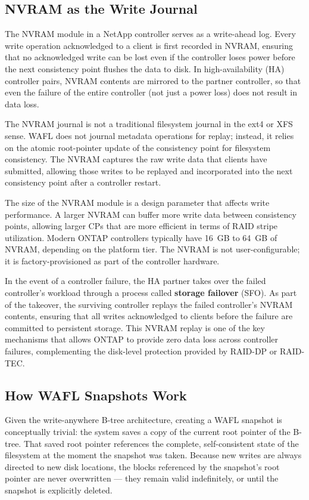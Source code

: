 \subsection{NVRAM as the Write Journal}

The NVRAM module in a NetApp controller serves as a write-ahead log. Every write operation acknowledged to a client is first recorded in NVRAM, ensuring that no acknowledged write can be lost even if the controller loses power before the next consistency point flushes the data to disk. In high-availability (HA) controller pairs, NVRAM contents are mirrored to the partner controller, so that even the failure of the entire controller (not just a power loss) does not result in data loss.

The NVRAM journal is not a traditional filesystem journal in the ext4 or XFS sense. WAFL does not journal metadata operations for replay; instead, it relies on the atomic root-pointer update of the consistency point for filesystem consistency. The NVRAM captures the raw write data that clients have submitted, allowing those writes to be replayed and incorporated into the next consistency point after a controller restart.

The size of the NVRAM module is a design parameter that affects write performance. A larger NVRAM can buffer more write data between consistency points, allowing larger CPs that are more efficient in terms of RAID stripe utilization. Modern ONTAP controllers typically have 16~GB to 64~GB of NVRAM, depending on the platform tier. The NVRAM is not user-configurable; it is factory-provisioned as part of the controller hardware.

In the event of a controller failure, the HA partner takes over the failed controller's workload through a process called \textbf{storage failover} (SFO). As part of the takeover, the surviving controller replays the failed controller's NVRAM contents, ensuring that all writes acknowledged to clients before the failure are committed to persistent storage. This NVRAM replay is one of the key mechanisms that allows ONTAP to provide zero data loss across controller failures, complementing the disk-level protection provided by RAID-DP or RAID-TEC.

\subsection{How WAFL Snapshots Work}

Given the write-anywhere B-tree architecture, creating a WAFL snapshot is conceptually trivial: the system saves a copy of the current root pointer of the B-tree. That saved root pointer references the complete, self-consistent state of the filesystem at the moment the snapshot was taken. Because new writes are always directed to new disk locations, the blocks referenced by the snapshot's root pointer are never overwritten --- they remain valid indefinitely, or until the snapshot is explicitly deleted.

